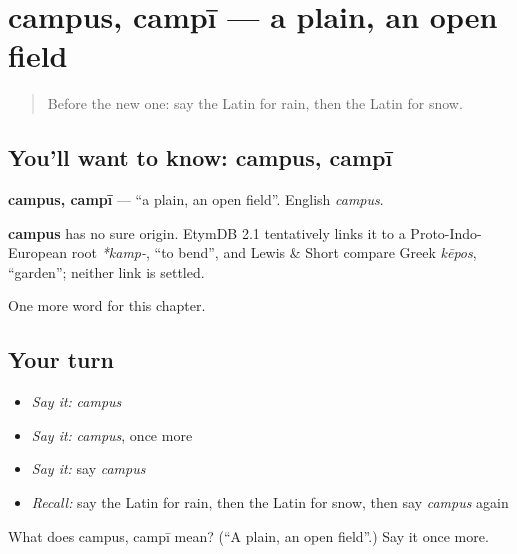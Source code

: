 \section[campus, campī]{campus, campī — a plain, an open field}

\label{lesson:LA-C89-campus}



\begin{quote}
Before the new one: say the Latin for rain, then the Latin for snow.
\end{quote}

\subsection*{You'll want to know: campus, campī}
\textbf{campus, campī} — \textquotedblleft{}a plain, an open field\textquotedblright{}. English \emph{campus}.

\begin{cousinweb}
\textbf{campus} has no sure origin. EtymDB 2.1 tentatively links it to a Proto-Indo-European root \emph{*kamp-}, \textquotedblleft{}to bend\textquotedblright{}, and Lewis \& Short compare Greek \emph{kēpos}, \textquotedblleft{}garden\textquotedblright{}; neither link is settled.
\end{cousinweb}

\begin{grammarlens}[title={What you've built}]
One more word for this chapter.
\end{grammarlens}

\subsection*{Your turn}
\begin{itemize}
\raggedright
  \item \emph{Say it:} \emph{campus}
  \item \emph{Say it:} \emph{campus}, once more
  \item \emph{Say it:} say \emph{campus}
  \item \emph{Recall:} say the Latin for rain, then the Latin for snow, then say \emph{campus} again
\end{itemize}

\begin{tcolorbox}[breakable,colback=teal!4,colframe=teal!35!black,title={Before you move on}]
What does campus, campī mean? (\textquotedblleft{}A plain, an open field\textquotedblright{}.) Say it once more.
\end{tcolorbox}

